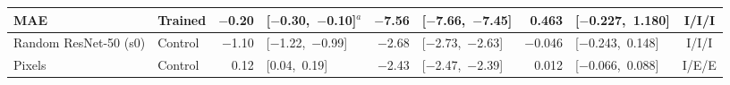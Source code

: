 {\begin{tabular}{llrlrlrlc}
MAE & Trained & \ensuremath{-}0.20 & \mbox{[\ensuremath{-}0.30,~\ensuremath{-}0.10]}$^{a}$ & \ensuremath{-}7.56 & \mbox{[\ensuremath{-}7.66,~\ensuremath{-}7.45]} & 0.463 & \mbox{[\ensuremath{-}0.227,~1.180]} & I/I/I \\
\midrule
Random ResNet-50 (s0) & Control & \ensuremath{-}1.10 & \mbox{[\ensuremath{-}1.22,~\ensuremath{-}0.99]} & \ensuremath{-}2.68 & \mbox{[\ensuremath{-}2.73,~\ensuremath{-}2.63]} & \ensuremath{-}0.046 & \mbox{[\ensuremath{-}0.243,~0.148]} & I/I/I \\
Pixels & Control & 0.12 & \mbox{[0.04,~0.19]} & \ensuremath{-}2.43 & \mbox{[\ensuremath{-}2.47,~\ensuremath{-}2.39]} & 0.012 & \mbox{[\ensuremath{-}0.066,~0.088]} & I/E/E \\
\bottomrule
\end{tabular}}
